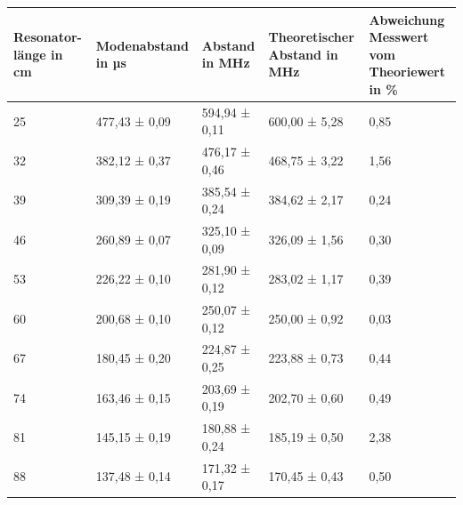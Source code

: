 \documentclass[bigchapter,colorback,accentcolor=tud4b,linedtoc,11pt]{tudreport}
\numberwithin{equation}{subsection}
\begin{document}
\begin{center}
  \begin{tabular}{ | p{2.0cm} | p{2.6cm} | p{2.8cm} | p{3.0cm} | p{4cm} | }
    \hline
    Resonator- länge in cm & Modenabstand in µs & Abstand in MHz & Theoretischer Abstand in MHz & Abweichung Messwert vom Theoriewert in \% \\ \hline
    25 & 477,43 ± 0,09 & 594,94 ± 0,11 & 600,00 ± 5,28 & 0,85 \\ \hline
    32 & 382,12 ± 0,37 & 476,17 ± 0,46 & 468,75 ± 3,22 & 1,56 \\ \hline
    39 & 309,39 ± 0,19 & 385,54 ± 0,24 & 384,62 ± 2,17 & 0,24 \\ \hline
    46 & 260,89 ± 0,07 & 325,10 ± 0,09 & 326,09 ± 1,56 & 0,30 \\ \hline
    53 & 226,22 ± 0,10 & 281,90 ± 0,12 & 283,02 ± 1,17 & 0,39 \\ \hline
    60 & 200,68 ± 0,10 & 250,07 ± 0,12 & 250,00 ± 0,92 & 0,03 \\ \hline
    67 & 180,45 ± 0,20 & 224,87 ± 0,25 & 223,88 ± 0,73 & 0,44 \\ \hline
    74 & 163,46 ± 0,15 & 203,69 ± 0,19 & 202,70 ± 0,60 & 0,49 \\ \hline
    81 & 145,15 ± 0,19 & 180,88 ± 0,24 & 185,19 ± 0,50 & 2,38 \\ \hline
    88 & 137,48 ± 0,14 & 171,32 ± 0,17 & 170,45 ± 0,43 & 0,50 \\ \hline
  \end{tabular}
\end{center}
\FloatBarrier
\end{document}
